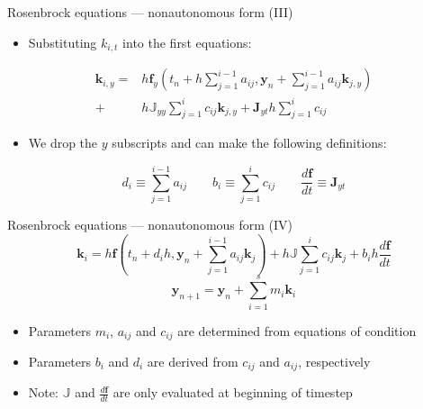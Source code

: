 \documentclass[serif]{beamer}
\begin{document}
\begin{frame}{Rosenbrock equations --- nonautonomous form (III)}
  \begin{itemize}
  \item<1-> Substituting $k_{i,t}$ into the first equations:
  \end{itemize}
  \begin{align*}
    \mathbf{k}_{i,y} = &  h\mathbf{f}_y \left(t_n + h\sum_{j=1}^{i-1}a_{ij},\mathbf{y}_n + \sum_{j=1}^{i-1}a_{ij}\mathbf{k}_{j,y}\right) \\
                                + & h\mathbb{J}_{yy}\sum_{j=1}^i c_{ij}\mathbf{k}_{j,y}  + \mathbf{J}_{yt}h\sum_{j=1}^i c_{ij}
  \end{align*}
  \begin{itemize}
  \item We drop the $y$ subscripts and can make the following definitions: 
  \end{itemize}
  \begin{equation}
    \nonumber d_i \equiv \sum_{j=1}^{i-1} a_{ij} \qquad  b_i \equiv \sum_{j=1}^i c_{ij} \qquad \frac{d\mathbf{f}}{dt} \equiv \mathbf{J}_{yt}
  \end{equation}
\end{frame}

\begin{frame}{Rosenbrock equations --- nonautonomous form (IV)}
  \begin{equation}
    \nonumber \mathbf{k}_{i} = h\mathbf{f} \left(t_n + d_ih,\mathbf{y}_n + \sum_{j=1}^{i-1}a_{ij}\mathbf{k}_{j}\right) 
                                + h\mathbb{J}\sum_{j=1}^i c_{ij}\mathbf{k}_{j}  + b_ih\frac{d\mathbf{f}}{dt}
  \end{equation}
  \begin{equation}
    \nonumber \mathbf{y}_{n+1} = \mathbf{y}_{n} + \sum_{i=1}^s m_i\mathbf{k}_i
  \end{equation}
  \vfill
  \begin{itemize}
  \item<1-> Parameters $m_i$, $a_{ij}$ and $c_{ij}$ are determined from equations of condition
  \item<1-> Parameters $b_i$ and $d_i$ are derived from $c_{ij}$ and $a_{ij}$, respectively
  \item<1-> \alert{Note:} $\mathbb{J}$ and $\frac{d\mathbf{f}}{dt}$ are only evaluated at beginning of timestep
  \end{itemize}
\end{frame}

\end{document}
